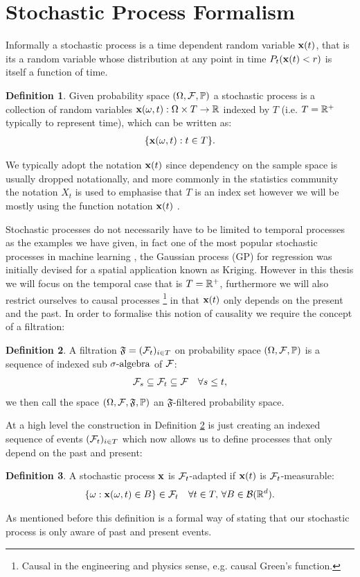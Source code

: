 \documentclass[a4paper,12pt,twoside,openright]{report}
\theoremstyle{definition}
\newtheorem{definition}{Definition}[section]
\begin{document}
\section{Stochastic Process Formalism}
Informally a stochastic process is a time dependent random variable ${\mathbf{x}}(t)$, that is its a random variable whose distribution at any point in time $P_t({\mathbf{x}}(t) < r)$  is itself a function of time.
\begin{definition}\label{def:stochproc}
Given probability space ${(\Omega, \mathcal{F}, \mathbb{P})}$ a stochastic process is a collection of random variables ${\mathbf{x}}(\omega, t) : \Omega \times T \rightarrow \mathbb{R}$ indexed by $T$ (i.e. $T={\mathbb{R}}^{+}$ typically to represent time), which can be written as:
\begin{align*}
    \{{\mathbf{x}}(\omega, t) : t \in T\}.
\end{align*}
\end{definition}
We typically adopt the notation ${\mathbf{x}}(t)$ since dependency on the sample space is usually dropped notationally, and more commonly in the statistics community the notation $X_t$ is used to emphasise that $T$ is an index set however we will be mostly using the function notation ${\mathbf{x}}(t)$ . 

Stochastic processes do not necessarily have to be limited to temporal processes as the examples we have given, in fact one of the most popular stochastic processes in machine learning , the Gaussian process (GP) for regression was initially devised for a spatial application known as Kriging. However in this thesis we will focus on the temporal case that is $T={\mathbb{R}}^{+}$, furthermore we will also restrict ourselves to causal processes \footnote{Causal in the engineering and physics sense, e.g. causal Green's function.} in that ${\mathbf{x}}(t)$ only depends on the present and the past. In order to formalise this notion of causality we require the concept of a filtration: 
\begin{definition}\label{def:filtration}
A filtration $\mathfrak{F} = ({\mathcal{F}}_{t})_{i\in T}$ on probability space ${(\Omega, \mathcal{F}, \mathbb{P})}$ is a sequence of indexed sub ${\sigma\text{-algebra}}$ of ${\mathcal{F}}$:
\begin{align*}
    {\mathcal{F}}_{s} \subseteq {\mathcal{F}}_{t} \subseteq {\mathcal{F}} \quad \forall  s \leq t,
\end{align*}
we then call the space ${(\Omega, \mathcal{F}, \mathfrak{F}, \mathbb{P})}$ an $\mathfrak{F}$-filtered probability space.
\end{definition}
At a high level the construction in Definition \ref{def:filtration} is just creating an indexed sequence of events $({\mathcal{F}}_{t})_{i\in T}$ which now allows us to define processes that only depend on the past and present:
\begin{definition}\label{def:adapted}
    A stochastic process ${\mathbf{x}}$ is ${\mathcal{F}}_t$-adapted  if ${\mathbf{x}}(t)$ is ${\mathcal{F}}_t$-measurable:
    \begin{align*}
        \{\omega :{\mathbf{x}}(\omega,t) \in B\} \in {\mathcal{F}}_t \quad \forall t \in T , \,\forall B \in {\mathcal{B}}({\mathbb{R}}^d).
    \end{align*}
\end{definition}
As mentioned before this definition is a formal way of stating that our stochastic process is only aware of past and present events.
\end{document}
